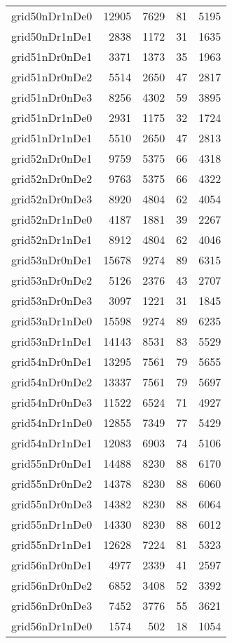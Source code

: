 \begin{longtable}{lrrrr}
grid50nDr1nDe0 & 12905 & 7629 & 81 & 5195 \\
grid50nDr1nDe1 & 2838 & 1172 & 31 & 1635 \\
grid51nDr0nDe1 & 3371 & 1373 & 35 & 1963 \\
grid51nDr0nDe2 & 5514 & 2650 & 47 & 2817 \\
grid51nDr0nDe3 & 8256 & 4302 & 59 & 3895 \\
grid51nDr1nDe0 & 2931 & 1175 & 32 & 1724 \\
grid51nDr1nDe1 & 5510 & 2650 & 47 & 2813 \\
grid52nDr0nDe1 & 9759 & 5375 & 66 & 4318 \\
grid52nDr0nDe2 & 9763 & 5375 & 66 & 4322 \\
grid52nDr0nDe3 & 8920 & 4804 & 62 & 4054 \\
grid52nDr1nDe0 & 4187 & 1881 & 39 & 2267 \\
grid52nDr1nDe1 & 8912 & 4804 & 62 & 4046 \\
grid53nDr0nDe1 & 15678 & 9274 & 89 & 6315 \\
grid53nDr0nDe2 & 5126 & 2376 & 43 & 2707 \\
grid53nDr0nDe3 & 3097 & 1221 & 31 & 1845 \\
grid53nDr1nDe0 & 15598 & 9274 & 89 & 6235 \\
grid53nDr1nDe1 & 14143 & 8531 & 83 & 5529 \\
grid54nDr0nDe1 & 13295 & 7561 & 79 & 5655 \\
grid54nDr0nDe2 & 13337 & 7561 & 79 & 5697 \\
grid54nDr0nDe3 & 11522 & 6524 & 71 & 4927 \\
grid54nDr1nDe0 & 12855 & 7349 & 77 & 5429 \\
grid54nDr1nDe1 & 12083 & 6903 & 74 & 5106 \\
grid55nDr0nDe1 & 14488 & 8230 & 88 & 6170 \\
grid55nDr0nDe2 & 14378 & 8230 & 88 & 6060 \\
grid55nDr0nDe3 & 14382 & 8230 & 88 & 6064 \\
grid55nDr1nDe0 & 14330 & 8230 & 88 & 6012 \\
grid55nDr1nDe1 & 12628 & 7224 & 81 & 5323 \\
grid56nDr0nDe1 & 4977 & 2339 & 41 & 2597 \\
grid56nDr0nDe2 & 6852 & 3408 & 52 & 3392 \\
grid56nDr0nDe3 & 7452 & 3776 & 55 & 3621 \\
grid56nDr1nDe0 & 1574 & 502 & 18 & 1054 \\

\end{longtable}
